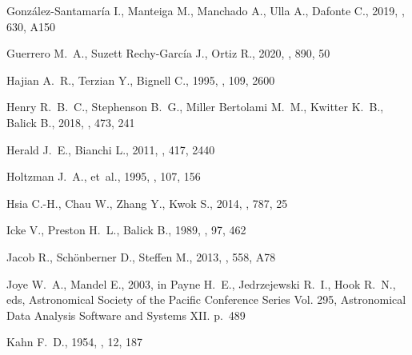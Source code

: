 \documentclass[useAMS, usenatbib]{mnras}
\begin{document}
\begin{thebibliography}{}
{González-Santamaría} I.,  {Manteiga} M.,  {Manchado} A.,  {Ulla} A.,
  {Dafonte} C.,  2019, \aap, 630, A150

{Guerrero} M.~A.,  {Suzett Rechy-García} J.,   {Ortiz} R.,  2020, \apj, 890,
  50

{Hajian} A.~R.,  {Terzian} Y.,   {Bignell} C.,  1995, \aj, 109, 2600

{Henry} R.~B.~C.,  {Stephenson} B.~G.,  {Miller Bertolami} M.~M.,  {Kwitter}
  K.~B.,   {Balick} B.,  2018, \mnras, 473, 241

{Herald} J.~E.,  {Bianchi} L.,  2011, \mnras, 417, 2440

{Holtzman} J.~A.,  et~al., 1995, \pasp, 107, 156

{Hsia} C.-H.,  {Chau} W.,  {Zhang} Y.,   {Kwok} S.,  2014, \apj, 787, 25

{Icke} V.,  {Preston} H.~L.,   {Balick} B.,  1989, \aj, 97, 462

{Jacob} R.,  {Schönberner} D.,   {Steffen} M.,  2013, \aap, 558, A78

{Joye} W.~A.,  {Mandel} E.,  2003, in {Payne} H.~E.,  {Jedrzejewski} R.~I.,
  {Hook} R.~N.,  eds,  Astronomical Society of the Pacific Conference Series
  Vol. 295, Astronomical Data Analysis Software and Systems XII. p.~489

{Kahn} F.~D.,  1954, \bain, 12, 187


\end{thebibliography}
\end{document}
